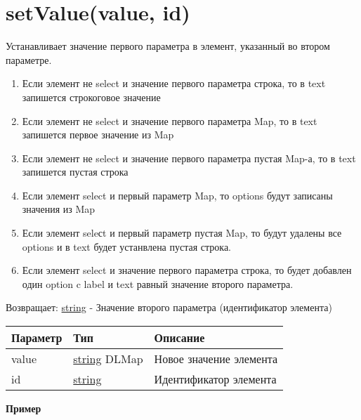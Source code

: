 \providecommand{\tightlist}{%
	\setlength{\itemsep}{0pt}\setlength{\parskip}{0pt}}

\setlength{\LTleft}{0pt}

\pagestyle{empty}

\hypertarget{setvaluevalue-id-string}{%
\section{setValue(value, id)}\label{setvaluevalue-id-string}}

Устанавливает значение первого параметра в элемент, указанный во втором
параметре.

\begin{enumerate}
\def\labelenumi{\arabic{enumi}.}
\tightlist
\item
  Если элемент не select и значение первого параметра строка, то в text
  запишется строкоговое значение
\item
  Если элемент не select и значение первого параметра Map, то в text
  запишется первое значение из Map
\item
  Если элемент не select и значение первого параметра пустая Map-а, то в
  text запишется пустая строка
\item
  Если элемент select и первый параметр Map, то options будут записаны
  значения из Map
\item
  Если элемент seleсt и первый параметр пустая Map, то будут удалены все
  options и в text будет устанвлена пустая строка.
\item
  Если элемент select и значение первого параметра строка, то будет
  добавлен один option c label и text равный значение второго параметра.
\end{enumerate}

Возвращает: \protect\hyperlink{string}{string} - Значение второго
параметра (идентификатор элемента)

\begin{longtable}[]{@{}lll@{}}
\toprule
Параметр & Тип & Описание\tabularnewline
\midrule
\endhead
value & \protect\hyperlink{string}{string} \textbar{} DLMap & Новое
значение элемента\tabularnewline
id & \protect\hyperlink{string}{string} & Идентификатор
элемента\tabularnewline
\bottomrule
\end{longtable}

\textbf{Пример}


